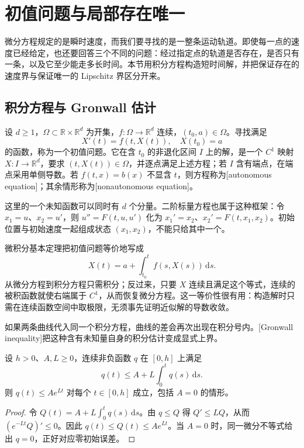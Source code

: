 \section{初值问题与局部存在唯一}
\label{b2:sec:ode-local-existence}

微分方程规定的是瞬时速度，而我们要寻找的是一整条运动轨道。即使每一点的速度已经给定，也还要回答三个不同的问题：经过指定点的轨道是否存在，是否只有一条，以及它至少能走多长时间。本节用积分方程构造短时间解，并把保证存在的速度界与保证唯一的 Lipschitz 界区分开来。

\subsection{积分方程与 Gronwall 估计}
\label{b2:subsec:ode-integral-gronwall}

\begin{definition}\label{b2:def:ode-initial-value}
设 \(d\geq1\)，\(\Omega\subset\mathbb R\times\mathbb R^d\) 为开集，\(f\colon\Omega\to\mathbb R^d\) 连续，\((t_0,a)\in\Omega\)。寻找满足
\[
 X'(t)=f(t,X(t)),\quad X(t_0)=a
\]
的函数，称为一个初值问题。它在含 \(t_0\) 的非退化区间 \(I\) 上的解，是一个 \(C^1\) 映射 \(X\colon I\to\mathbb R^d\)，要求 \((t,X(t))\in\Omega\)，并逐点满足上述方程；若 \(I\) 含有端点，在端点采用单侧导数。若 \(f(t,x)=b(x)\) 不显含 \(t\)，则方程称为[autonomous equation]；其余情形称为[nonautonomous equation]。
\end{definition}

这里的一个未知函数可以同时有 \(d\) 个分量。二阶标量方程也属于这种框架：令 \(x_1=u\)、\(x_2=u'\)，则 \(u''=F(t,u,u')\) 化为 \(x_1'=x_2\)、\(x_2'=F(t,x_1,x_2)\)。初始位置与初始速度一起组成状态 \((x_1,x_2)\)，不能只给其中一个。

\ProseParagraphBreak
微积分基本定理把初值问题等价地写成
\[
 X(t)=a+\int_{t_0}^t f(s,X(s))\,\mathrm ds.
\]
从微分方程到积分方程只需积分；反过来，只要 \(X\) 连续且满足这个等式，连续的被积函数就使右端属于 \(C^1\)，从而恢复微分方程。这一等价性很有用：构造解时只需在连续函数空间中取极限，无须事先证明近似解的导数收敛。

\ProseParagraphBreak
如果两条曲线代入同一个积分方程，曲线的差会再次出现在积分号内。[Gronwall inequality]把这种含有未知量自身的积分估计变成显式上界。

\begin{lemma}[Gronwall]\label{b2:lem:ode-gronwall}
设 \(h>0\)、\(A,L\geq0\)，连续非负函数 \(q\) 在 \([0,h]\) 上满足
\[
 q(t)\leq A+L\int_0^t q(s)\,\mathrm ds.
\]
则 \(q(t)\leq A e^{Lt}\) 对每个 \(t\in[0,h]\) 成立，包括 \(A=0\) 的情形。
\end{lemma}
\begin{proof}
令 \(Q(t)=A+L\int_0^t q(s)\,\mathrm ds\)。由 \(q\leq Q\) 得 \(Q'\leq LQ\)，从而 \((e^{-Lt}Q)'\leq0\)。因此 \(q(t)\leq Q(t)\leq A e^{Lt}\)。当 \(A=0\) 时，同一微分不等式给出 \(q=0\)，正好对应零初始误差。
\end{proof}

